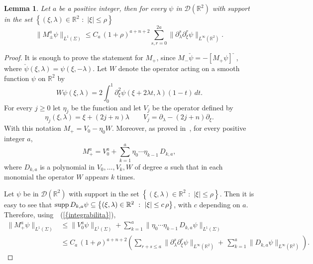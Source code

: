\documentclass[12pt,a4paper]{amsart}
\theoremstyle{plain}
\newtheorem{lemma}[theorem]{Lemma}
\theoremstyle{definition}
\numberwithin{equation}{section}
\begin{document}
\begin{lemma}\label{potenzeM+}
Let  $a$ be a positive integer, then
for every $\psi$ in 
 ${\mathcal D}({\mathbb R}^2)$
  with support in the set 
$ {\left\{{(\xi,{\lambda})\in {\mathbb R}^2\,\,:\,\, |\xi|\leq {\rho}}\right\}}$
$$
\|M_\pm^a \psi \|_{L^1({\Sigma})}\leq C_a\, (1+{\rho})^{a+{n}+2}
\sum_{s,r=0}^{2a}\|\partial_{\lambda}^s\partial_\xi^r \psi \|_{L^\infty({\mathbb R}^2)}. 
$$
\end{lemma}
\begin{proof} 
It is enough to prove the statement for $M_+$, since   
$M_-\check\psi = -\left[M_+\psi \right]\!\!\check{\phantom f}$, where
$\check\psi(\xi,{\lambda})=\psi(\xi,-{\lambda})$. 
 Let 
 $W$ denote the operator acting on  a smooth function $\psi $ on ${\mathbb R}^2$ by
 $$
 W \psi(\xi,{\lambda}) = 2\int_0^1\partial^2_\xi \psi(\xi+2{\lambda} t,{\lambda} )(1-t)\,dt.
 $$
For every $ j\geq 0$ let $\eta_j$ be the function 
and let  $V_j$  be the operator defined by
$$
\eta_j(\xi,{\lambda})=\xi+(2j+{n}){\lambda}
\qquad V_j= \partial_{\lambda}-(2j+{n}) \partial_\xi.
$$  
With this notation $M_+=V_0-\eta_0W$. 
Moreover, as proved in~\cite[{Lemma 4.5}]{ADR2}, for every positive integer $a$,
\begin{equation}
M_+^a=V_0^a+\sum_{k=1}^a \eta_0\cdots \eta_{k-1}\, D_{k,a},
\end{equation}
where  $D_{k,a}$ is a polynomial  in $V_0,\ldots,V_{k},W$ of degree $a$ 
such that in each monomial the operator $W$ appears  $k$ times.

Let $\psi $ be in   ${\mathcal D}({\mathbb R}^2)$
 with support in the set 
$ {\left\{{(\xi,{\lambda})\in {\mathbb R}^2\,\,:\,\, |\xi|\leq {\rho}}\right\}}$.
Then it is easy to see that 
 ${\text{\rm supp\,}} D_{k,a} \psi\subseteq  {\left\{{(\xi,{\lambda})\in {\mathbb R}^2\,\,:\,\, |\xi|\leq c\,{\rho}}\right\}}$, 
 with $c$ depending on $a$. Therefore, using~{~(\ref{{integrabilita}})},
  \begin{align*}
\|  M_+^a \psi\|_{L^1({\Sigma})}&
 \leq
 \|V_0^a \psi\|_{L^1({\Sigma})}+\sum_{k=1}^a \| \eta_0\cdots \eta_{k-1}\, D_{k,a} \psi\|_{L^1({\Sigma})}
  \\
 &\leq
 C_a\, (1+{\rho})^{a+n+2}\left(
\sum_{r+s\leq a} \|\partial_{\lambda}^s\partial_\xi^r \psi \|_{L^\infty({\mathbb R}^2)}
+
\,\sum_{k=1}^a \| D_{k,a} \psi\|_{L^\infty({\mathbb R}^2)}
\right).
\end{align*}


\end{proof}
\end{document}
